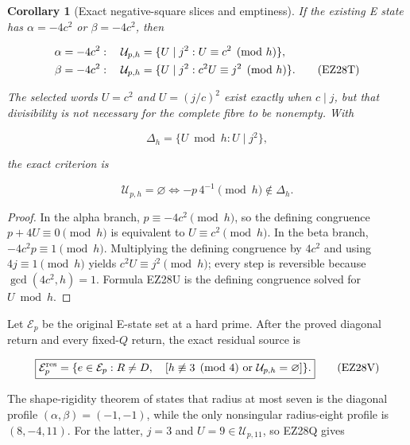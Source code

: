 \documentclass[11pt]{article}
\newcounter{none}
\newtheorem{corollary}[theorem]{Corollary}
\theoremstyle{definition}\newtheorem{definition}[theorem]{Definition}
\theoremstyle{remark}\newtheorem{remark}[theorem]{Remark}
\begin{document}
\begin{corollary}[Exact negative-square slices and emptiness]
If the existing E state has \(\alpha=-4c^2\) or \(\beta=-4c^2\), then

\begin{align}
 \alpha=-4c^2:\quad
 \mathcal U_{p,h}&=\{U\mid j^2:U\equiv c^2\pmod h\},\notag\\
 \beta=-4c^2:\quad
 \mathcal U_{p,h}&=\{U\mid j^2:c^2U\equiv j^2\pmod h\}. \tag{EZ28T}
\end{align}

The selected words \(U=c^2\) and \(U=(j/c)^2\) exist exactly when
\(c\mid j\), but that divisibility is not necessary for the complete fibre to
be nonempty.  With

\[
 \Delta_h=\{U\bmod h:U\mid j^2\},
\]

the exact criterion is

\begin{equation}
 \boxed{\mathcal U_{p,h}=\varnothing\iff
 -p\,4^{-1}\pmod h\notin\Delta_h.}                    \tag{EZ28U}
\end{equation}
\end{corollary}

\begin{proof}
In the alpha branch, \(p\equiv-4c^2\pmod h\), so the defining congruence
\(p+4U\equiv0\pmod h\) is equivalent to \(U\equiv c^2\pmod h\).
In the beta branch, \(-4c^2p\equiv1\pmod h\).  Multiplying the defining
congruence by \(4c^2\) and using \(4j\equiv1\pmod h\) yields
\(c^2U\equiv j^2\pmod h\); every step is reversible because
\(\gcd(4c^2,h)=1\).  Formula EZ28U is the defining congruence solved for
\(U\bmod h\).
\end{proof}

Let \(\mathcal E_p\) be the original E-state set at a hard prime.  After the
proved diagonal return and every fixed-\(Q\) return, the exact residual source
is

\begin{equation}
 \boxed{\mathcal E_p^{\rm res}=
 \{e\in\mathcal E_p:R\ne D,
 \quad [h\not\equiv3\pmod4\text{ or }\mathcal U_{p,h}=\varnothing]\}.} \tag{EZ28V}
\end{equation}

The shape-rigidity theorem of \cite{Turn7} states that radius at most seven
is the diagonal profile \((\alpha,\beta)=(-1,-1)\), while the only
nonsingular radius-eight profile is \((8,-4,11)\).  For the latter,
\(j=3\) and \(U=9\in\mathcal U_{p,11}\), so EZ28Q gives
\end{document}
